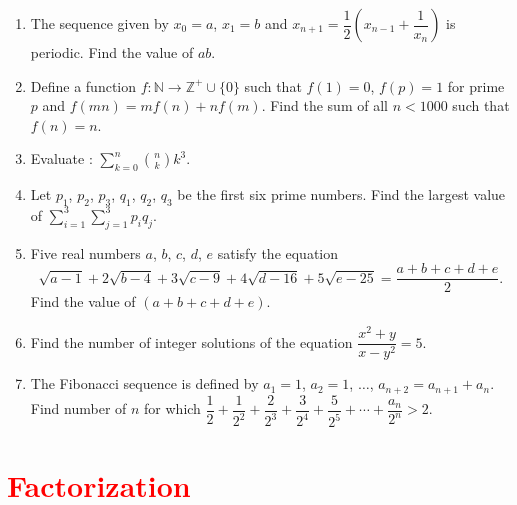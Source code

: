 \documentclass[11pt, a4paper]{article}
\begin{document}
\begin{enumerate}
	\item The sequence given by $x_0 = a$, $x_1 = b$ and $x_{n+1} = \dfrac{1}{2}\left( x_{n-1} + \dfrac{1}{x_n} \right)$ is periodic. Find the value of $ab$.
	
	\item Define a function $f : \mathbb{N} \rightarrow \mathbb{Z}^{+}\cup \{0\}$ such that $f(1) = 0$, $f(p) = 1$ for prime $p$ and $f(mn) = mf(n) + nf(m)$. Find the sum of all $n < 1000$ such that $f(n) = n$.
	
	\item Evaluate : $ \displaystyle{\sum \limits_{k = 0}^{n} \binom{n}{k} k^3} $.

	\item Let $p_1$, $p_2$, $p_3$, $q_1$, $q_2$, $q_3$ be the first six prime numbers. Find the largest value of $\sum \limits_{i = 1}^{3} \sum \limits_{j = 1}^{3} p_i q_j$.
	
	\item Five real numbers $a$, $b$, $c$, $d$, $e$ satisfy the equation
	$$ \sqrt{a-1} + 2\sqrt{b-4} + 3\sqrt{c-9} + 4\sqrt{d-16} + 5\sqrt{e-25} = \dfrac{a+b+c+d+e}{2}.$$ Find the value of $(a+b+c+d+e)$.
	
	\item Find the number of integer solutions of the equation $\dfrac{x^2 + y}{x - y^2} = 5$.
	
	\item The Fibonacci sequence is defined by $a_1 = 1$, $a_2 = 1$, $\ldots$, $a_{n+2} = a_{n+1} + a_n$. Find number of $n$ for which $\dfrac{1}{2} + \dfrac{1}{2^2} + \dfrac{2}{2^3} + \dfrac{3}{2^4} + \dfrac{5}{2^5} + \cdots + \dfrac{a_n}{2^n} > 2$.
	
\end{enumerate}





\section{\textcolor{red}{Factorization}}
\end{document}
